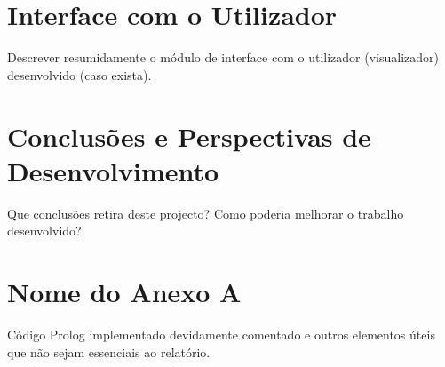 \documentclass[15pt,a4paper]{article}
\begin{document}
\section{Interface com o Utilizador}
Descrever  resumidamente o módulo de interface com o utilizador (visualizador) desenvolvido (caso exista).

\section{Conclusões e Perspectivas de Desenvolvimento}
Que conclusões  retira deste projecto? Como poderia melhorar o trabalho desenvolvido?

\clearpage
{}
\renewcommand\refname{Bibliografia}



\newpage
\appendix
\section{Nome do Anexo A}
Código Prolog implementado devidamente comentado e outros elementos úteis que não sejam essenciais ao relatório.
\end{document}
